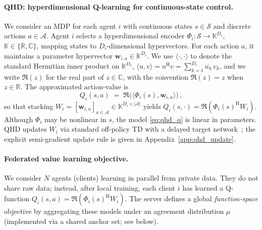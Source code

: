 \documentclass[sigconf,anonymous]{aamas}
\theoremstyle{plain}
\theoremstyle{definition}
\theoremstyle{remark}
\begin{document}
\paragraph{QHD: hyperdimensional Q-learning for continuous-state control.}
We consider an MDP for each agent $i$ with continuous states $s\in\mathcal{S}$ and discrete actions $a\in\mathcal{A}$.  Agent $i$ selects a hyperdimensional encoder
$\Phi_i:\mathcal{S}\to\mathbb{K}^{D_i}$, $\mathbb{K}\in\{\mathbb{R},\mathbb{C}\}$,
mapping states to $D_i$-dimensional hypervectors.  For each action $a$, it maintains a parameter hypervector $\mathbf w_{i,a}\in\mathbb{K}^{D_i}$. We use $\langle \cdot, \cdot \rangle$
to denote the standard Hermitian inner product on $\mathbb{K}^{D_i}$,
$\langle u, v \rangle = u^{\mathrm{H}} v = \sum_{k=1}^{D_i} \overline{u_k}\,v_k$,
and we write $\Re(z)$ for the real part of $z \in \mathbb{C}$, with the
convention $\Re(z) = z$ when $z \in \mathbb{R}$. The approximated action-value is
\begin{equation}
Q_i(s,a)\;=\;\Re\!\bigl(\langle \Phi_i(s), \mathbf w_{i,a}\rangle\bigr)\,,
\label{eq:qhd_q}
\end{equation}
so that stacking $W_i=[\mathbf w_{i,a}]_{a\in\mathcal{A}}\in\mathbb{K}^{D_i\times|\mathcal{A}|}$ yields
$Q_i(s,\cdot)=\Re(\Phi_i(s)^{\mathrm H}W_i)$.  Although $\Phi_i$ may be nonlinear in $s$, the model \eqref{eq:qhd_q} is linear in parameters. QHD updates $W_i$ via standard off-policy TD with a delayed target network~\citep{ni2022qhd}; the explicit semi-gradient update rule is given in Appendix~\ref{app:qhd_update}.


\paragraph{Federated value learning objective.}  We consider $N$ agents (clients) learning in parallel from private data. They do not share raw data; instead, after local training, each client $i$ has learned a Q-function $Q_i(s,a)=\Re(\Phi_i(s)^{\mathrm H}W_i)$.  The server defines a global \emph{function-space} objective by aggregating these models under an agreement distribution $\mu$ (implemented via a shared anchor set; see below).
\end{document}
